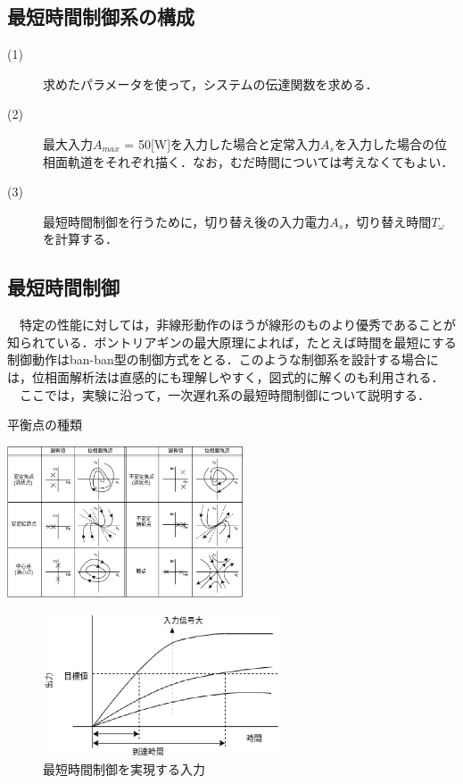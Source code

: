 \documentclass[12pt]{jsarticle}
\begin{document}
\subsection{最短時間制御系の構成}
\begin{description}
\item[(1)]求めたパラメータを使って，システムの伝達関数を求める．
\item[(2)]最大入力$A_{max}$ = 50[W]を入力した場合と定常入力$A_s$を入力した場合の位相面軌道をそれぞれ描く．なお，むだ時間については考えなくてもよい．
\item[(3)]最短時間制御を行うために，切り替え後の入力電力$A_s$，切り替え時間$T_\omega$を計算する．
\end{description}
\subsection{最短時間制御}
　特定の性能に対しては，非線形動作のほうが線形のものより優秀であることが知られている．ボントリアギンの最大原理によれば，たとえば時間を最短にする制御動作はban-ban型の制御方式をとる．このような制御系を設計する場合には，位相面解析法は直感的にも理解しやすく，図式的に解くのも利用される．\\
　ここでは，実験に沿って，一次遅れ系の最短時間制御について説明する．\\
\begin{table}[tb]
  \begin{center}
    \caption{平衡点の種類}
    \includegraphics[clip,width=7.0cm]{../Img/FigC1.eps}
    \label{FigC1}
  \end{center}
\end{table}
\begin{figure}[tb]
  \begin{center}
    \includegraphics[clip,width=7.0cm]{../Img/FigC4.eps}
    \caption{最短時間制御を実現する入力}
    \label{FigC4}
  \end{center}
\end{figure}
\end{document}
